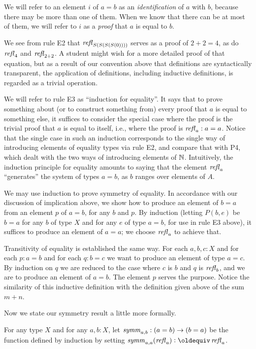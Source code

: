 We will refer to an element $i$ of $a=b$ as an {\em identification} of $a$ with $b$, because there may be more than one of them.  When we know
that there can be at most of them, we will refer to $i$ as a {\em proof} that $a$ is equal to $b$.

We see from rule E2 that $\mathop{{\it refl}_{S(S(S(S(0))))}}$ serves as a proof of $2+2=4$, as do $\mathop{{\it refl}_{4}}$ and $\mathop{{\it refl}_{2+2}}$.  A student might wish for a
more detailed proof of that equation, but as a result of our convention above that definitions are syntactically transparent, the application of
definitions, including inductive definitions, is regarded as a trivial operation.

We will refer to rule E3 as ``induction for equality''.  It says that to prove something about (or to construct something from) every proof that
$a$ is equal to something else, it suffices to consider the special case where the proof is the trivial proof that $a$ is equal to itself, i.e.,
where the proof is $\mathop{{\it refl}_{a}} : a=a$.  Notice that the single case in such an induction corresponds to the single way of introducing elements of
equality types via rule E2, and compare that with P4, which dealt with the two ways of introducing elements of $\mathbb{N}$.
Intuitively, the induction principle for equality amounts to saying that the element $\mathop{{\it refl}_{a}}$ ``generates'' the system of types $a=b$, as $b$
ranges over elements of $A$.

We may use induction to prove symmetry of equality.  In accordance with our discussion of implication above, we show how to produce an element
of $b=a$ from an element $p$ of $a=b$, for any $b$ and $p$.  By induction (letting $P(b,e)$ be $b=a$ for any $b$ of type $X$ and for any $e$ of
type $a=b$, for use in rule E3 above), it suffices to produce an element of $a=a$; we choose $\mathop{{\it refl}_{a}}$ to achieve that.

Transitivity of equality is established the same way.  For each $a,b,c:X$ and for each $p:a=b$ and for each $q:b=c$ we want to produce an
element of type $a=c$.  By induction on $q$ we are reduced to the case where $c$ is $b$ and $q$ is $\mathop{{\it refl}_{b}}$, and we are to produce an element
of $a=b$.  The element $p$ serves the purpose.  Notice the similarity of this inductive definition with the definition given above of the sum
$m+n$.

Now we state our symmetry result a little more formally.

\begin{definition}\label{def:eq-symm}
  For any type $X$ and for any $a,b:X$, let $\mathop{\mathit{symm}}_{a,b} : (a=b) \to (b=a)$ be the function defined by induction by setting
  $\symm_{a,a}(\refl a) \defeq \refl a$.
\end{definition}

